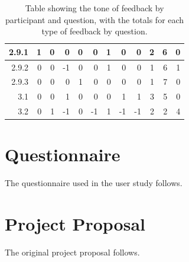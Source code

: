 \documentclass[12pt,twoside,notitlepage,xetex]{report}
\begin{document}
\begin{center}
\begin{table}[H]
\begin{center}
\begin{tabular}{|r||r|r|r|r||r|r|r|r||r|r|r|}
2.9.1 & 1 & 0 & 0 & 0 & 0 & 1 & 0 & 0 & 2 & 6 & 0\\ \hline
2.9.2 & 0 & 0 & -1 & 0 & 0 & 1 & 0 & 0 & 1 & 6 & 1\\ \hline
2.9.3 & 0 & 0 & 0 & 1 & 0 & 0 & 0 & 0 & 1 & 7 & 0\\ \hline
3.1 & 0 & 0 & 1 & 0 & 0 & 0 & 1 & 1 & 3 & 5 & 0\\ \hline
3.2 & 0 & 1 & -1 & 0 & -1 & 1 & -1 & -1 & 2 & 2 & 4\\
\hline
\end{tabular}
\end{center}
\caption{Table showing the tone of feedback by participant and question, with the totals for each type of feedback by question.}
\end{table}
\end{center}

\chapter{Questionnaire}

The questionnaire used in the user study follows.



\cleardoublepage

\chapter{Project Proposal}

The original project proposal follows.


% 
\end{document}

